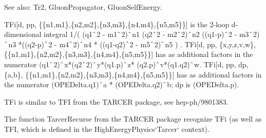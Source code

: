 See also: Tr2, GluonPropagator, GluonSelfEnergy.





TFi[d, pp, \{\{n1,m1\},\{n2,m2\},\{n3,m3\},\{n4,m4\},\{n5,m5\}\}] is the 2-loop d-dimensional integral 1/( (q1\(\RawWedge\)2 -
  m1\(\RawWedge\)2)\(\RawWedge\)n1 (q2\(\RawWedge\)2 - m2\(\RawWedge\)2)\(\RawWedge\)n2 ((q1-p)\(\RawWedge\)2 -
  m3\(\RawWedge\)2)\(\RawWedge\)n3 *((q2-p)\(\RawWedge\)2 - m4\(\RawWedge\)2)\(\RawWedge\)n4 * ((q1-q2)\(\RawWedge\)2 -
  m5\(\RawWedge\)2)\(\RawWedge\)n5 ) . TFi[d, pp, \{x,y,z,v,w\}, \{\{n1,m1\},\{n2,m2\},\{n3,m3\},\{n4,m4\},\{n5,m5\}\}] has as additional
  factors in the numerator (q1\(\RawWedge\)2)\(\RawWedge\)x*(q2\(\RawWedge\)2)\(\RawWedge\)y*(q1.p)\(\RawWedge\)z*
  (q2.p)\(\RawWedge\)v*(q1.q2)\(\RawWedge\)w. TFi[d, pp, dp, \{a,b\}, \{\{n1,m1\},\{n2,m2\},\{n3,m3\},\{n4,m4\},\{n5,m5\}\}] has as
  additional factors in the numerator (OPEDelta.q1)\(\RawWedge\)a * (OPEDelta.q2)\(\RawWedge\)b; dp is (OPEDelta.p).

TFi is similar to TFI from the TARCER package, see  hep-ph/9801383.

The function TarcerRecurse from the TARCER package recognize TFi (as well as TFI, which is defined in the HighEnergyPhysics`Tarcer`
  context).

